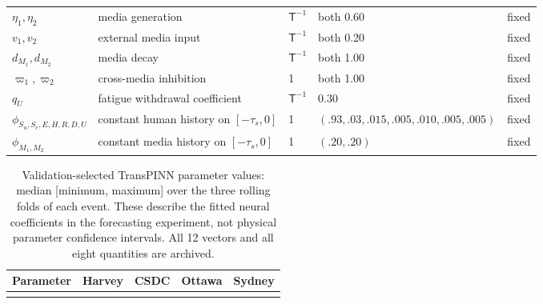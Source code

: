 \begin{table}[t]
\begin{tabular}{lllll}
$\eta_1,\eta_2$ & media generation & $\mathsf T^{-1}$ & both 0.60 & fixed\\
$v_1,v_2$ & external media input & $\mathsf T^{-1}$ & both 0.20 & fixed\\
$d_{M_1},d_{M_2}$ & media decay & $\mathsf T^{-1}$ & both 1.00 & fixed\\
$\varpi_1,\varpi_2$ & cross-media inhibition & 1 & both 1.00 & fixed\\
$q_U$ & fatigue withdrawal coefficient & $\mathsf T^{-1}$ & 0.30 & fixed\\
$\phi_{S_u,S_e,E,H,R,D,U}$ & constant human history on $[-\tau_s,0]$ & 1 & $(.93,.03,.015,.005,.010,.005,.005)$ & fixed\\
$\phi_{M_1,M_2}$ & constant media history on $[-\tau_s,0]$ & 1 & $(.20,.20)$ & fixed\\
\bottomrule
\end{tabular}
\end{table}

\begin{table}[t]
\centering\scriptsize
\caption{Validation-selected TransPINN parameter values: median [minimum, maximum] over the three rolling folds of each event. These describe the fitted neural coefficients in the forecasting experiment, not physical parameter confidence intervals. All 12 vectors and all eight quantities are archived.}
\label{tab:neural_parameters}
\setlength{\tabcolsep}{7pt}
\begin{tabular}{lcccc}
\toprule Parameter & Harvey & CSDC & Ottawa & Sydney\\\midrule

\\[-6pt]\bottomrule
\end{tabular}
\end{table}
